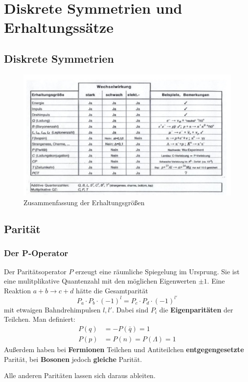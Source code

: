 \chapter{Diskrete Symmetrien und Erhaltungssätze}
\section{Diskrete Symmetrien}
\begin{figure}
	\centering
	\includegraphics[width=.7\textwidth]{./img/symmetries.jpg}
	\caption{Zusammenfassung der Erhaltungsgrößen}
	\label{fig:symmetries}
\end{figure}

\section{Parität}
\subsection{Der P-Operator}
Der Paritätsoperator $P$ erzeugt eine räumliche Spiegelung im Ursprung.
Sie ist eine mulitplikative Quantenzahl mit den möglichen Eigenwerten $\pm 1$.
Eine Reaktion $a+b\longrightarrow c+d$ hätte die Gesamtparität
\begin{equation*}
	P_a\cdot P_b\cdot (-1)^l = P_c\cdot P_d\cdot (-1)^{l'}
\end{equation*}
mit etwaigen Bahndrehimpulsen $l,l'$.
Dabei sind $P_i$ die \textbf{Eigenparitäten} der Teilchen.
Man definiert:
\begin{align*}
	P(q) &= -P(\bar{q}) = 1 \\
	P(p) &= P(n) = P(\Lambda) = 1
\end{align*}
Außerdem haben bei \textbf{Fermionen} Teilchen und Antiteilchen \textbf{entgegengesetzte} Parität,
bei \textbf{Bosonen} jedoch \textbf{gleiche} Parität.

Alle anderen Paritäten lassen sich daraus ableiten.

